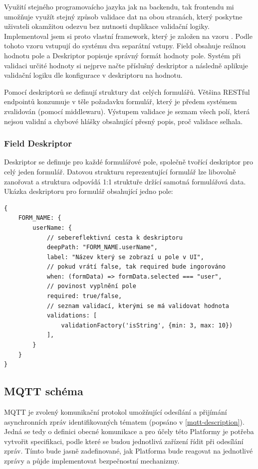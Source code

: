 Využití stejného programovaícho jazyka jak na backendu, tak frontendu mi umožňuje využít stejný způsob validace dat na obou stranách, který poskytne uživateli okamžitou odezvu bez nutnosti duplikace validační logiky. Implementoval jsem si proto vlastní framework, který je založen na vzoru  \cite{field-descriptor-pattern}. Podle tohoto vzoru vstupují do systému dva separátní vstupy. Field obsahuje reálnou hodnotu pole a Deskriptor popisuje správný formát hodnoty pole. Systém při validaci určité hodnoty si nejprve načte příslušný deskriptor a následně aplikuje validační logiku dle konfigurace v deskriptoru na hodnotu.

Pomocí deskriptorů se definují struktury dat celých formulářů. Většina RESTful endpointů konzumuje v těle požadavku formulář, který je předem systémem zvalidován (pomocí middlewaru). Výstupem validace je seznam všech polí, která nejsou validní a chybové hlášky obsahující přesný popis, proč validace selhala.

\subsubsection{Field Deskriptor}
Deskriptor se definuje pro každé formulářové pole, společně tvořící deskriptor pro celý jeden formulář. Datovou strukturu reprezentující formulář lze libovolně zanořovat a struktura odpovídá 1:1 struktuře držící samotná formulářová data. Ukázka deskriptoru pro formulář obsahující jedno pole:

\begin{verbatim}
{
    FORM_NAME: {
        userName: {
            // sebereflektivní cesta k deskriptoru
            deepPath: "FORM_NAME.userName",        
            label: "Název který se zobrazí u pole v UI",
            // pokud vrátí false, tak required bude ingorováno
            when: (formData) => formData.selected === "user", 
            // povinost vyplnění pole 
            required: true/false,
            // seznam validací, kterými se má validovat hodnota
            validations: [
                validationFactory('isString', {min: 3, max: 10})
            ],   
        }
    }
}
\end{verbatim}


\subsection{MQTT schéma}
MQTT je zvolený komunikační protokol umožňující odesílání a přijímání asynchronních zpráv identifikovaných tématem (popsáno v \ref{mqtt-description}). Jedná se tedy o definici obecné komunikace a pro účely této Platformy je potřeba vytvořit specifikaci, podle které se budou jednotlivá zařízení řídit při odesílání zpráv. Tímto bude jasně zadefinované, jak Platforma bude reagovat na jednotlivé zprávy a půjde implementovat bezpečnostní mechanizmy.

